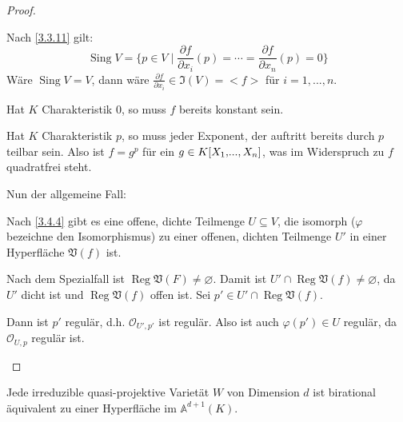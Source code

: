 \documentclass[a4paper,12pt]{scrbook}
\theoremstyle{keinenummern} %
\theoremstyle{mitnummern}
\theoremstyle{unserbeweis}
\newtheorem{proof}{Beweis}
\def\A{\mathbb{A}}
\def\V{\mathfrak{V}}
\def\I{\mathfrak{I}}
\def\O{\mathcal{O}}
\newcommand{\Sing}{\operatorname{Sing}}
\newcommand{\Reg}{\operatorname{Reg}}
\renewcommand{\phi}{\varphi}
\newcommand{\leer}{\ensuremath{\varnothing}}
\renewcommand{\dotsc}{\ensuremath{\!...}}
\newcommand{\polyx}[1][n]{\ensuremath%
  [X_{1},\dotsc,X_{#1}]}
\begin{document}
\begin{proof}
\begin{enumerate}
Nach \cref{3.3.11} gilt:\[\Sing V=\{p\in V \mid \frac{\partial f}{\partial x_i}(p)=\dotsm=\frac{\partial f}{\partial x_n}(p)=0\}\]
Wäre $\Sing V=V$, dann wäre $\frac{\partial f}{\partial x_i}\in \I(V)=<f>$ für $i=1,\dotsc,n$.

Hat $K$ Charakteristik $0$, so muss $f$ bereits konstant sein.

Hat $K$ Charakteristik $p$, so muss jeder Exponent, der auftritt bereits durch $p$ teilbar sein. Also ist $f=g^p$ für ein $g\in K\polyx$, was im Widerspruch zu $f$ quadratfrei steht.

Nun der allgemeine Fall:

Nach \cref{3.4.4} gibt es eine offene, dichte Teilmenge $U\subseteq V$, die isomorph ($\phi$ bezeichne den Isomorphismus) zu einer offenen, dichten Teilmenge $U'$ in einer Hyperfläche $\V(f)$ ist.

Nach dem Spezialfall ist $\Reg \V(F)\neq \leer$. Damit ist $U'\cap \Reg \V(f)\neq \leer$, da $U'$ dicht ist und $\Reg \V(f)$ offen ist. Sei $p'\in U'\cap \Reg \V(f)$.

Dann ist $p'$ regulär, d.h. $\O_{U',p'}$ ist regulär. Also ist auch $\phi(p') \in U$ regulär, da $\O_{U,p}$ regulär ist.
  \end{enumerate}
\end{proof}
\begin{lem}\label{3.4.4} Jede irreduzible quasi-projektive Varietät $W$ von Dimension $d$ ist birational äquivalent zu einer Hyperfläche im $\A^{d+1}(K)$.
\end{lem}
\end{document}
